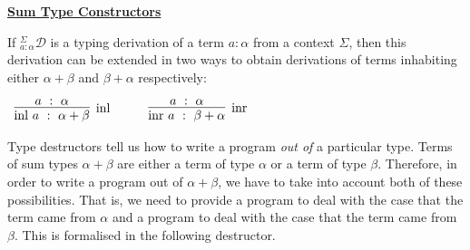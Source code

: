 \documentclass{book}
\begin{document}
    \begin{mdframed}

        \underline{{\bf Sum Type Constructors}}

        If $^{\Sigma}_{a : \alpha}\mathcal{D}$ is a typing derivation of a term $a : \alpha$ from a context $\Sigma$, then this derivation can be extended in two ways to obtain derivations of terms inhabiting either $\alpha + \beta$ and $\beta + \alpha$ respectively: 

        \begin{center}
            $\begin{array}{c c c}
              \infer[\text{\inl}]{\inl \ a \ : \ \alpha + \beta}{a \ : \ \alpha}
        
              &
              \quad
              &
        
              \infer[\text{\inr}]{\inr \ a \ : \ \beta + \alpha}{a \ : \ \alpha}
        
            \end{array}$
          \end{center}
    \end{mdframed}

    Type destructors tell us how to write a program \emph{out of} a particular type. Terms of sum types $\alpha + \beta$ are either a term of type $\alpha$ or a term of type $\beta$. Therefore, in order to write a program out of $\alpha + \beta$, we have to take into account both of these possibilities. That is, we need to provide a program to deal with the case that the term came from $\alpha$ and a program to deal with the case that the term came from $\beta$. This is formalised in the following destructor. 
\end{document}
